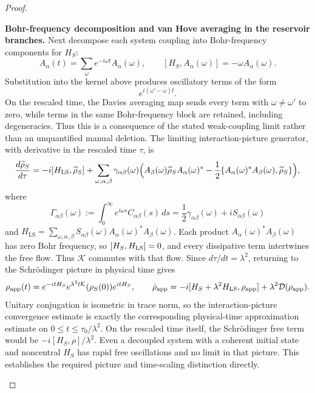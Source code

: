 \documentclass[12pt,a4paper]{article}
\begin{document}
\begin{proof}
\begin{proofsteps}
\item \textbf{Bohr-frequency decomposition and van Hove averaging in the
reservoir branches.}
Next decompose each system coupling into Bohr-frequency components for \(H_S\):
\[
A_\alpha(t)=\sum_\omega e^{-i\omega t}A_\alpha(\omega),
\qquad
[H_S,A_\alpha(\omega)]=-\omega A_\alpha(\omega).
\]
Substitution into the kernel above produces oscillatory terms of the form
\[
  e^{i(\omega'-\omega)t}.
\]
On the rescaled time, the Davies averaging map sends every term with
\(\omega\neq\omega'\) to zero, while terms in the same Bohr-frequency block
are retained, including degeneracies.  Thus this is a consequence of the
stated weak-coupling limit rather than an unquantified manual deletion.  The
limiting interaction-picture generator, with derivative in the rescaled
time \(\tau\), is
\[
\frac{d\widetilde\rho_S}{d\tau}
=
-i[H_{\mathrm{LS}},\widetilde\rho_S]
+
\sum_{\omega,\alpha,\beta}
\gamma_{\alpha\beta}(\omega)
\Bigl(
A_\beta(\omega)\widetilde\rho_S A_\alpha(\omega)^*
-\frac12\{A_\alpha(\omega)^*A_\beta(\omega),\widetilde\rho_S\}
\Bigr),
\]
where
\[
\Gamma_{\alpha\beta}(\omega)
:=
\int_0^\infty e^{i\omega s}C_{\alpha\beta}(s)\,ds
=
\frac12\gamma_{\alpha\beta}(\omega)+iS_{\alpha\beta}(\omega)
\]
and \(H_{\mathrm{LS}}=\sum_{\omega,\alpha,\beta}S_{\alpha\beta}(\omega)A_\alpha(\omega)^*A_\beta(\omega)\).
Each product \(A_\alpha(\omega)^*A_\beta(\omega)\) has zero Bohr
frequency, so \([H_S,H_{\rm LS}]=0\), and every dissipative term
intertwines the free flow.  Thus \(\mathcal K\) commutes with that flow.
Since \(d\tau/dt=\lambda^2\), returning to the Schr\"odinger picture in
physical time gives
\[
 \rho_{\rm app}(t)
 =e^{-itH_S}e^{\lambda^2t\mathcal K}(\rho_S(0))e^{itH_S},
 \qquad
 \dot\rho_{\rm app}
 =-i[H_S+\lambda^2H_{\rm LS},\rho_{\rm app}]
                         +\lambda^2\mathcal D(\rho_{\rm app}).
\]
Unitary conjugation is isometric in trace norm, so the interaction-picture
convergence estimate is exactly the corresponding physical-time
approximation estimate on \(0\le t\le\tau_0/\lambda^2\).
On the rescaled time itself, the Schr\"odinger free term would be
\(-i[H_S,\rho]/\lambda^2\).  Even a decoupled system with a coherent
initial state and noncentral \(H_S\) has rapid free oscillations and no
limit in that picture.  This establishes the required picture and
time-scaling distinction directly.



\end{proofsteps}
\end{proof}
\end{document}
